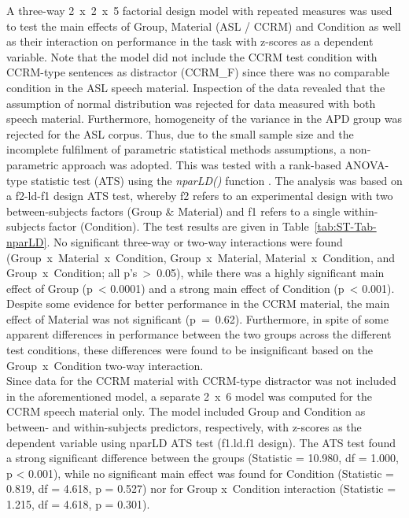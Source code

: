 \documentclass[a4paper, twoside]{templates/ociamthesis}
\begin{document}
A three-way 2~x~2~x~5 factorial design model with repeated measures was used to test the main effects of Group, Material (ASL / CCRM) and Condition as well as their interaction on performance in the task with z-scores as a dependent variable. Note that the model did not include the CCRM test condition with CCRM-type sentences as distractor (CCRM\_F) since there was no comparable condition in the ASL speech material. Inspection of the data revealed that the assumption of normal distribution was rejected for data measured with both speech material. Furthermore, homogeneity of the variance in the APD group was rejected for the ASL corpus. Thus, due to the small sample size and the incomplete fulfilment of parametric statistical methods assumptions, a non-parametric approach was adopted. This was tested with a rank-based ANOVA-type statistic test (ATS) using the \emph{nparLD()} function \autocite[nparLD package;][]{nparLDPackageR}. The analysis was based on a f2-ld-f1 design ATS test, whereby f2 refers to an experimental design with two between-subjects factors (Group \& Material) and f1 refers to a single within-subjects factor (Condition). The test results are given in Table~\ref{tab:ST-Tab-nparLD}. No significant three-way or two-way interactions were found (Group~x~Material~x~Condition, Group~x~Material, Material~x~Condition, and Group~x~Condition; all p's~\textgreater~0.05), while there was a highly significant main effect of Group (p~\textless{} 0.0001) and a strong main effect of Condition (p~\textless{} 0.001). Despite some evidence for better performance in the CCRM material, the main effect of Material was not significant (p~=~0.62). Furthermore, in spite of some apparent differences in performance between the two groups across the different test conditions, these differences were found to be insignificant based on the Group~x~Condition two-way interaction.\\

Since data for the CCRM material with CCRM-type distractor was not included in the aforementioned model, a separate 2~x~6 model was computed for the CCRM speech material only. The model included Group and Condition as between- and within-subjects predictors, respectively, with z-scores as the dependent variable using nparLD ATS test (f1.ld.f1 design). The ATS test found a strong significant difference between the groups (Statistic = 10.980, df = 1.000, p \textless{} 0.001), while no significant main effect was found for Condition (Statistic = 0.819, df = 4.618, p = 0.527) nor for Group x~Condition interaction (Statistic = 1.215, df = 4.618, p = 0.301).
\end{document}

